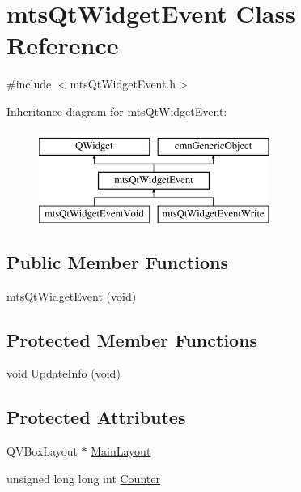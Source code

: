 \hypertarget{classmts_qt_widget_event}{}\section{mts\+Qt\+Widget\+Event Class Reference}
\label{classmts_qt_widget_event}


{\ttfamily \#include $<$mts\+Qt\+Widget\+Event.\+h$>$}

Inheritance diagram for mts\+Qt\+Widget\+Event\+:\begin{figure}[H]
\begin{center}
\leavevmode
\includegraphics[height=3.000000cm]{df/d13/classmts_qt_widget_event}
\end{center}
\end{figure}
\subsection*{Public Member Functions}
\begin{DoxyCompactItemize}
\item 
\hyperlink{classmts_qt_widget_event_acb55c76a8003771c2dc09048d3572065}{mts\+Qt\+Widget\+Event} (void)
\end{DoxyCompactItemize}
\subsection*{Protected Member Functions}
\begin{DoxyCompactItemize}
\item 
void \hyperlink{classmts_qt_widget_event_a57e32160b00d22e4306e44e712c0696e}{Update\+Info} (void)
\end{DoxyCompactItemize}
\subsection*{Protected Attributes}
\begin{DoxyCompactItemize}
\item 
Q\+V\+Box\+Layout $\ast$ \hyperlink{classmts_qt_widget_event_a9f914a226a59e9181130296046811466}{Main\+Layout}
\item 
unsigned long long int \hyperlink{classmts_qt_widget_event_aad5793fac31d42a9fc1bc8bcd2d265b8}{Counter}
\end{DoxyCompactItemize}



